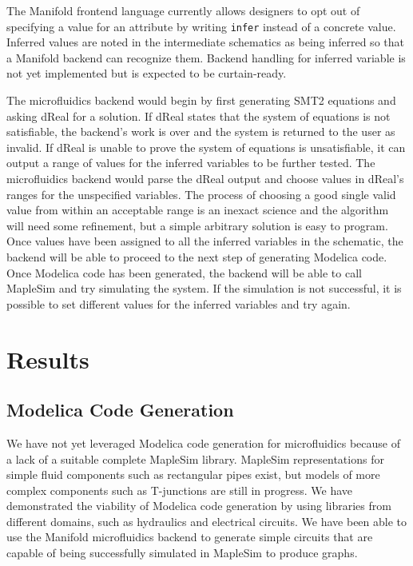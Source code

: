 The Manifold frontend language currently allows designers to opt out of
specifying a value for an attribute by writing {\tt infer} instead of a
concrete value. Inferred values are noted in the intermediate schematics as
being inferred so that a Manifold backend can recognize them. Backend handling
for inferred variable is not yet implemented but is expected to be curtain-ready.

The microfluidics backend would begin by first generating SMT2 equations and asking dReal for a solution.
If dReal states that the system of equations is not satisfiable, the backend's work is over and the system is returned to the user as invalid.
If dReal is unable to prove the system of equations is unsatisfiable, it can output a range of values for the inferred variables to be further tested.
The microfluidics backend would parse the dReal output and choose values in dReal's ranges for the unspecified variables.
The process of choosing a good single valid value from within an acceptable range is an inexact science and the algorithm will need some refinement, but a simple arbitrary solution is easy to program.
Once values have been assigned to all the inferred variables in the schematic, the backend will be able to proceed to the next step of generating Modelica code.
Once Modelica code has been generated, the backend will be able to call MapleSim and try simulating the system.
If the simulation is not successful, it is possible to set different values for the inferred variables and try again.

\section{Results}

\subsection{Modelica Code Generation}

We have not yet leveraged Modelica code generation for microfluidics because of a lack of a suitable complete MapleSim library.
MapleSim representations for simple fluid components such as rectangular pipes exist, but models of more complex components such as T-junctions are still in progress.
We have demonstrated the viability of Modelica code generation by using libraries from different domains, such as hydraulics and electrical circuits.
We have been able to use the Manifold microfluidics backend to generate simple circuits that are capable of being successfully simulated in MapleSim to produce graphs.

